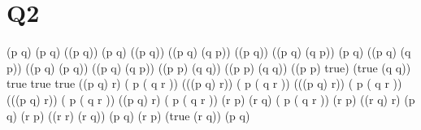 \documentclass{article}
\begin{document}
\section*{Q2}
\begin{zed} (p \land q) \implies (p \iff q) 
\also \vspace{-0.25cm} \iff (\lnot (p \land q)) \lor (p \iff q)  
\also \vspace{-0.25cm} \iff (\lnot (p \land q)) \lor ((p \implies q) \land (q \implies p))
\also \vspace{-0.25cm} \iff (\lnot (p \land q)) \lor ((\lnot p \lor q) \land (\lnot q \lor p)) 
\also \vspace{-0.25cm} \iff (\lnot p \lor \lnot q) \lor ((\lnot p \lor q) \land (\lnot q \lor p)) 
\also \vspace{-0.25cm} \iff ((\lnot p \lor \lnot q) \lor (\lnot p \lor q)) \land ((\lnot p \lor \lnot q) \lor (\lnot q \lor p))  
\also \vspace{-0.25cm} \iff ((\lnot p \lor \lnot p) \lor (\lnot q \lor q)) \land ((\lnot p \lor p) \lor (\lnot q \lor \lnot q)) 
\also \vspace{-0.25cm} \iff ((\lnot p \lor \lnot p) \lor true) \land (true \lor (\lnot q \lor \lnot q)) 
\also \vspace{-0.25cm} \iff true \land true
\also \vspace{-0.25cm} \iff true \vspace{0.25cm}
\also ((p \lor q) \implies r) \implies ( \lnot p \lor ( q \lor r ))
\also \vspace{-0.25cm} \iff (\lnot ((p \lor q) \implies r)) \lor ( \lnot p \lor ( q \lor r ))
\also \vspace{-0.25cm} \iff (\lnot (\lnot (p \lor q) \lor r)) \lor ( \lnot p \lor ( q \lor r ))
\also \vspace{-0.25cm} \iff ((\lnot \lnot (p \lor q) \land \lnot r)) \lor ( \lnot p \lor ( q \lor r ))
\also \vspace{-0.25cm} \iff ((p \lor q) \land \lnot r) \lor ( \lnot p \lor ( q \lor r ))
\also \vspace{-0.25cm} \iff (\lnot r \land p) \lor (\lnot r \land q) \lor ( \lnot p \lor ( q \lor r ))
\also \vspace{-0.25cm} \iff (\lnot r \land p) \lor ((\lnot r \land q) \lor r) \lor (\lnot p \lor q) 
\also \vspace{-0.25cm} \iff (\lnot r \land p) \lor ((r \lor \lnot r) \land (r \lor q)) \lor (\lnot p \lor q) 
\also \vspace{-0.25cm} \iff (\lnot r \land p) \lor (true \land (r \lor q)) \lor (\lnot p \lor q) 

\end{zed}
\end{document}
